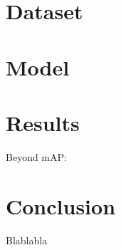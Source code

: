 \documentclass[
]{report}
\begin{document}
\chapter{Dataset}\label{sec-dataset}

\chapter{Model}\label{model}

\chapter{Results}\label{results}

Beyond mAP: \textcite{BeyondMAP}

\chapter{Conclusion}\label{conclusion}

Blablabla


\printbibliography[title=Bibliography]
\end{document}
